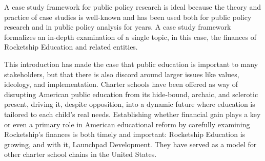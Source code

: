A case study framework for public policy research is ideal because the theory and practice of case studies is well-known and has been used both for public policy research and in  public policy analysis for years. A case study framework formalizes an in-depth examination of a single topic, in this case, the finances of Rocketship Education and related entities.

This introduction has made the case that public education is important to many stakeholders, but that there is also discord around larger issues like values, ideology, and implementation. Charter schools have been offered as way of disrupting American public education from its hide-bound, archaic, and sclerotic present, driving it, despite opposition, into a dynamic future where education is tailored to each child's real needs. Establishing whether financial gain plays a key or even a primary role in American educational reform by carefully examining Rocketship's finances is both timely and important: Rocketship Education is growing, and with it, Launchpad Development. They have served as a model for other charter school chains in the United States.

